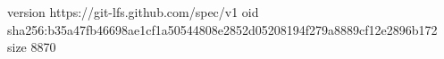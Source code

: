 version https://git-lfs.github.com/spec/v1
oid sha256:b35a47fb46698ae1cf1a50544808e2852d05208194f279a8889cf12e2896b172
size 8870
